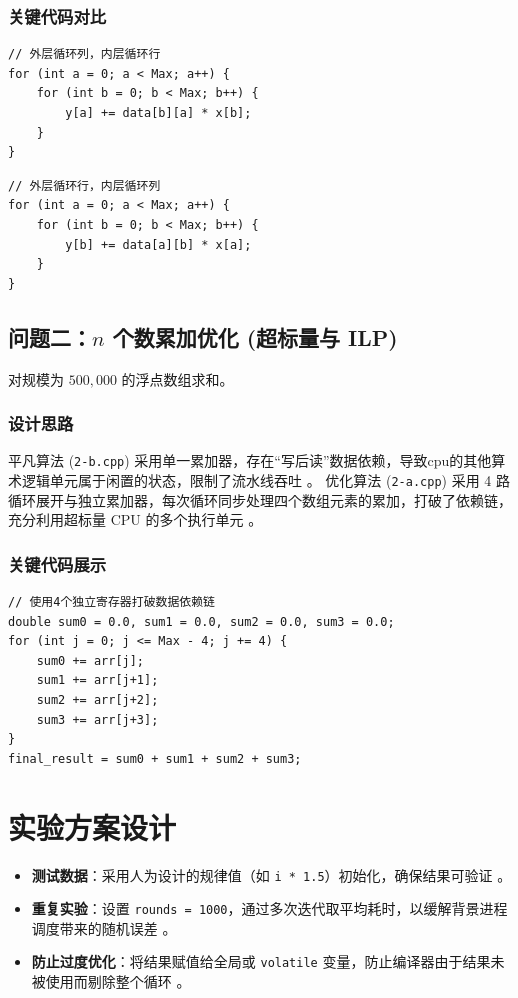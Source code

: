 \documentclass[12pt,a4paper]{ctexart}
\begin{document}
\subsubsection{关键代码对比}
\begin{lstlisting}[caption={平凡算法中的跨步访问 (1-a.cpp)}]
// 外层循环列，内层循环行
for (int a = 0; a < Max; a++) {
    for (int b = 0; b < Max; b++) {
        y[a] += data[b][a] * x[b];
    }
}
\end{lstlisting}

\begin{lstlisting}[caption={优化算法中的连续访问 (1-b.cpp)}]
// 外层循环行，内层循环列
for (int a = 0; a < Max; a++) {
    for (int b = 0; b < Max; b++) {
        y[b] += data[a][b] * x[a];
    }
}
\end{lstlisting}

\subsection{问题二：$n$ 个数累加优化 (超标量与 ILP)}
对规模为 $500,000$ 的浮点数组求和。
\subsubsection{设计思路}
平凡算法 (\texttt{2-b.cpp}) 采用单一累加器，存在“写后读”数据依赖，导致cpu的其他算术逻辑单元属于闲置的状态，限制了流水线吞吐 。
优化算法 (\texttt{2-a.cpp}) 采用 4 路循环展开与独立累加器，每次循环同步处理四个数组元素的累加，打破了依赖链，充分利用超标量 CPU 的多个执行单元 。

\subsubsection{关键代码展示}
\begin{lstlisting}[caption={4路超标量累加优化 (2-a.cpp)}]
// 使用4个独立寄存器打破数据依赖链
double sum0 = 0.0, sum1 = 0.0, sum2 = 0.0, sum3 = 0.0;
for (int j = 0; j <= Max - 4; j += 4) {
    sum0 += arr[j];
    sum1 += arr[j+1];
    sum2 += arr[j+2];
    sum3 += arr[j+3];
}
final_result = sum0 + sum1 + sum2 + sum3;
\end{lstlisting}

\section{实验方案设计}
\begin{itemize}
    \item \textbf{测试数据}：采用人为设计的规律值（如 \texttt{i * 1.5}）初始化，确保结果可验证 。
    \item \textbf{重复实验}：设置 \texttt{rounds = 1000}，通过多次迭代取平均耗时，以缓解背景进程调度带来的随机误差 。
    \item \textbf{防止过度优化}：将结果赋值给全局或 \texttt{volatile} 变量，防止编译器由于结果未被使用而剔除整个循环 。
\end{itemize}
\end{document}
